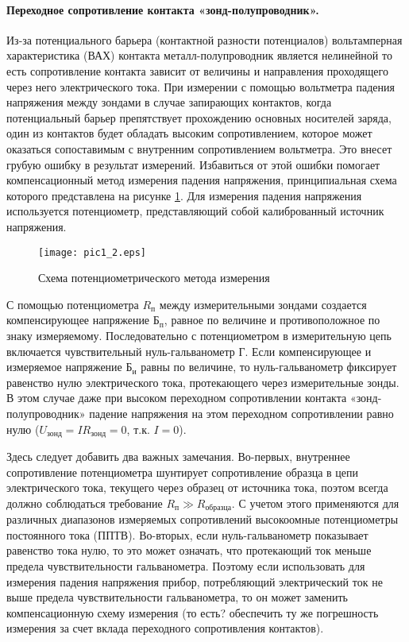 \paragraph{Переходное сопротивление контакта «зонд-полупроводник».}
Из-за потенциального барьера (контактной разности потенциалов) вольтамперная характеристика (ВАХ) контакта металл-полупроводник является нелинейной то есть сопротивление контакта зависит от величины и направления проходящего через него электрического тока. При измерении с помощью вольтметра падения напряжения между зондами в случае запирающих контактов, когда потенциальный барьер препятствует прохождению основных носителей заряда, один из контактов будет обладать высоким сопротивлением, которое может оказаться сопоставимым с внутренним сопротивлением вольтметра. Это внесет грубую ошибку в результат измерений. Избавиться от этой ошибки помогает компенсационный метод измерения падения напряжения, принципиальная схема которого представлена на рисунке \ref{1_potenc}. Для измерения падения напряжения используется потенциометр, представляющий собой калиброванный источник напряжения.

\begin{figure}[h!]\centering
\texttt{[image: pic1\_2.eps]}
\caption{Схема потенциометрического метода измерения}
\label{1_potenc}
\end{figure}

С помощью потенциометра $R_{\text{п}}$ между измерительными зондами создается компенсирующее напряжение $\text{Б}_{\text{п}}$, равное по величине и противоположное по знаку измеряемому. Последовательно с потенциометром в измерительную цепь включается чувствительный нуль-гальванометр Г. Если компенсирующее и измеряемое напряжение $\text{Б}_{\text{и}}$ равны по величине, то нуль-гальванометр фиксирует равенство нулю электрического тока, протекающего через измерительные зонды. В этом случае даже при высоком переходном сопротивлении контакта «зонд-полупроводник» падение напряжения на этом переходном сопротивлении равно нулю ($U_{\text{зонд}} = I R_{\text{зонд}} = 0$, т.к. $I = 0$).

Здесь следует добавить два важных замечания. Во-первых, внутреннее сопротивление потенциометра шунтирует сопротивление образца в цепи электрического тока, текущего через образец от источника тока, поэтом всегда должно соблюдаться требование $R_{\text{п}} \gg R_{\text{образца}}$. С учетом этого применяются для различных диапазонов измеряемых сопротивлений высокоомные потенциометры постоянного тока (ППТВ). Во-вторых, если нуль-гальванометр показывает равенство тока нулю, то это может означать, что протекающий ток меньше предела чувствительности гальванометра. Поэтому если использовать для измерения падения напряжения прибор, потребляющий электрический ток не выше предела чувствительности гальванометра, то он может заменить компенсационную схему измерения (то есть? обеспечить ту же погрешность измерения за счет вклада переходного сопротивления контактов).

